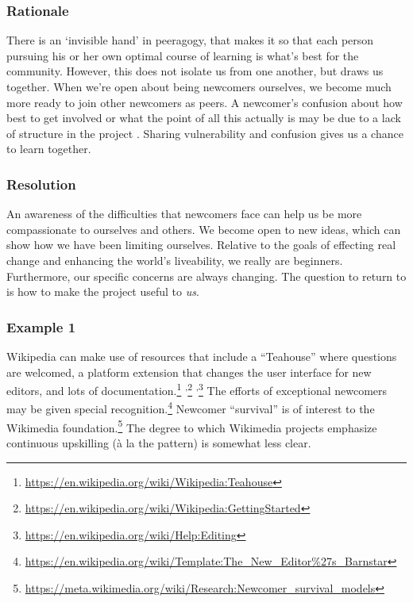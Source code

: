 %
\subsubsection*{Rationale} 
There is an `invisible hand' in peeragogy, that makes it so that
each person pursuing his or her own optimal course of learning is
what's best for the community.  However, this does not isolate us from
one another, but draws us together.
%
When we're open about being newcomers ourselves, we become much more
ready to join other newcomers as peers. A
newcomer's confusion about how best to get involved
or what the point of all this actually is may be due to a lack of structure in the project
.  Sharing vulnerability and confusion gives us a chance to learn together.
%

\subsubsection*{Resolution}
An awareness of the difficulties that newcomers face can
help us be more compassionate to ourselves and others.  We
become open to new ideas, which can show how we have
been limiting ourselves.
%
Relative to the goals of effecting real change and enhancing the
world's liveability, we really are beginners.  Furthermore, our
specific concerns are always changing.  The question to return to is
how to make the project useful to \emph{us}.

\subsubsection*{Example 1} Wikipedia  can make use of resources that
include a ``Teahouse'' where questions are welcomed, a platform extension that changes the user
interface for new editors, and lots of documentation.\footnote{\url{https://en.wikipedia.org/wiki/Wikipedia:Teahouse}}%
\textsuperscript{,}\footnote{\url{https://en.wikipedia.org/wiki/Wikipedia:GettingStarted}}%
\textsuperscript{,}\footnote{\url{https://en.wikipedia.org/wiki/Help:Editing}}
The efforts of exceptional newcomers may be given special
recognition.\footnote{\url{https://en.wikipedia.org/wiki/Template:The_New_Editor\%27s_Barnstar}}
Newcomer ``survival'' is of interest to the Wikimedia
foundation.\footnote{\url{https://meta.wikimedia.org/wiki/Research:Newcomer_survival_models}}
The degree to which Wikimedia projects emphasize continuous upskilling
(\`a la the  pattern) is somewhat less clear.

